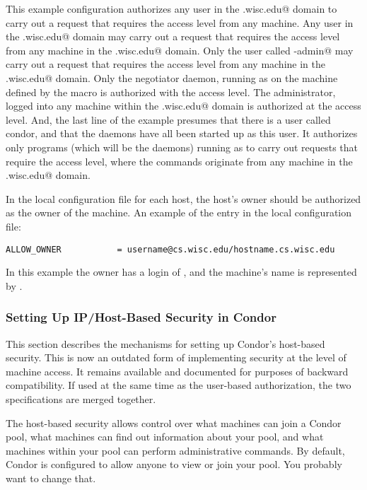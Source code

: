 This example configuration authorizes
any user in the 
\verb@cs.wisc.edu@ domain to 
carry out a request that requires the 
 access level
from any machine.
Any user in the 
\verb@cs.wisc.edu@ domain may 
carry out a request that requires the 
 access level
from any machine in the
\verb@cs.wisc.edu@ domain.
Only the user called \verb@condor-admin@ may 
carry out a request that requires the 
 access level
from any machine in the
\verb@cs.wisc.edu@ domain.
Only the negotiator daemon, running as
\verb@condor@ on the machine defined by the
 macro is authorized 
with the
 access level.
The administrator, logged into any machine within
the \verb@cs.wisc.edu@ domain is authorized at the
 access level.
And, the last line of the example presumes that there is a
user called condor, and that the daemons have all been started
up as this user.
It authorizes only programs (which will be the daemons)
running as 
\verb@condor@ to
carry out requests that require the 
 access level,
where the commands originate from
any machine in the
\verb@cs.wisc.edu@ domain.

In the local configuration file for each host, the host's
owner should be authorized
as the owner of the machine.
An example of the entry in the local configuration file:
\begin{verbatim}
ALLOW_OWNER           = username@cs.wisc.edu/hostname.cs.wisc.edu
\end{verbatim}
In this example the owner has a login of
\verb@username@, and the machine's name is represented by
\verb@hostname@.

\subsubsection{\label{sec:Host-Security}Setting Up IP/Host-Based Security in
Condor} 

This section describes the mechanisms for setting up Condor's
host-based security.  
This is now an outdated form of implementing security at
the level of machine access. 
It remains available and documented for purposes of backward compatibility.
If used at the same time as the user-based authorization,
the two specifications are merged together.

The host-based security allows control over what machines can
join a Condor pool, what machines can find out information about
your pool, and what machines within your pool can perform
administrative commands.  By default, Condor is configured to allow
anyone to view or join your pool.  You probably want to change that.

